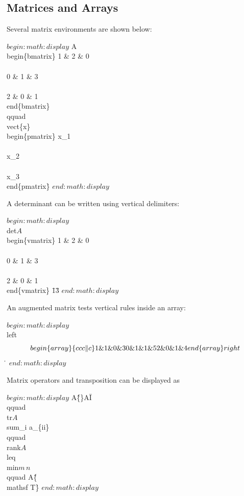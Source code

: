 \documentclass[10pt,a4paper,twocolumn]{article}
\theoremstyle{definition}
\theoremstyle{remark}
\newcommand{\vect}[1]{\bm{#1}}
\DeclareMathOperator{\tr}{tr}
\DeclareMathOperator{\rank}{rank}
\begin{document}
\subsection{Matrices and Arrays}

Several matrix environments are shown below:

$begin:math:display$
  A\=
  \\begin\{bmatrix\}
    1 \& 2 \& 0\\\\
    0 \& 1 \& 3\\\\
    2 \& 0 \& 1
  \\end\{bmatrix\}\,
  \\qquad
  \\vect\{x\}\=
  \\begin\{pmatrix\}
    x\_1\\\\
    x\_2\\\\
    x\_3
  \\end\{pmatrix\}\.
$end:math:display$

A determinant can be written using vertical delimiters:

$begin:math:display$
  \\det\(A\)
  \=
  \\begin\{vmatrix\}
    1 \& 2 \& 0\\\\
    0 \& 1 \& 3\\\\
    2 \& 0 \& 1
  \\end\{vmatrix\}
  \=13\.
$end:math:display$

An augmented matrix tests vertical rules inside an array:

$begin:math:display$
  \\left\[
  \\begin\{array\}\{ccc\|c\}
    1 \& 1 \& 0 \& 3\\\\
    0 \& 1 \& 1 \& 5\\\\
    2 \& 0 \& 1 \& 4
  \\end\{array\}
  \\right\]\.
$end:math:display$

Matrix operators and transposition can be displayed as

$begin:math:display$
  A\^\{\}A\=I\,
  \\qquad
  \\tr\(A\)\=\\sum\_i a\_\{ii\}\,
  \\qquad
  \\rank\(A\)\\leq\\min\(m\,n\)\,
  \\qquad
  A\^\{\\mathsf T\}\.
$end:math:display$
\end{document}
